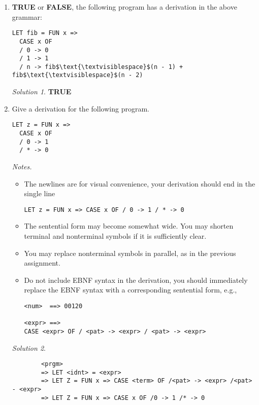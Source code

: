 \documentclass{article}
\theoremstyle{remark} \newtheorem*{solution}{Solution}
\begin{document}
\begin{enumerate}
\item
\textbf{TRUE} or \textbf{FALSE}, the following program has a
derivation in the above grammar:
\begin{lstlisting}[mathescape=true]
LET fib = FUN x =>
  CASE x OF
  / 0 -> 0
  / 1 -> 1
  / n -> fib$\text{\textvisiblespace}$(n - 1) + fib$\text{\textvisiblespace}$(n - 2)
\end{lstlisting}
\begin{mdframed}
    \begin{solution}
        \textbf{TRUE}
    \end{solution}
\end{mdframed}
\pagebreak
\item Give a derivation for the following program.
\begin{lstlisting}
LET z = FUN x =>
  CASE x OF
  / 0 -> 1
  / * -> 0
\end{lstlisting}
\textit{Notes.}
\begin{itemize}
\item
The newlines are for visual convenience, your derivation should end in
the single line
\begin{lstlisting}
LET z = FUN x => CASE x OF / 0 -> 1 / * -> 0
\end{lstlisting}
\item
The sentential form may become somewhat wide. You may shorten terminal
and nonterminal symbols if it is sufficiently clear.
\item
You may replace nonterminal symbols in parallel, as in the previous
assignment.
\item
Do not include EBNF syntax in the derivation, you should immediately
replace the EBNF syntax with a corresponding sentential form, e.g.,
\begin{lstlisting}
<num>  ==> 00120

<expr> ==>
CASE <expr> OF / <pat> -> <expr> / <pat> -> <expr>
\end{lstlisting}
\end{itemize}
\begin{solution}
    \begin{mdframed}
    \begin{lstlisting}
        <prgm>
        => LET <idnt> = <expr>
        => LET Z = FUN x => CASE <term> OF /<pat> -> <expr> /<pat> - <expr>
        => LET Z = FUN x => CASE x OF /0 -> 1 /* -> 0
    \end{lstlisting}
\end{mdframed}
\end{solution}


\end{enumerate}
\end{document}
